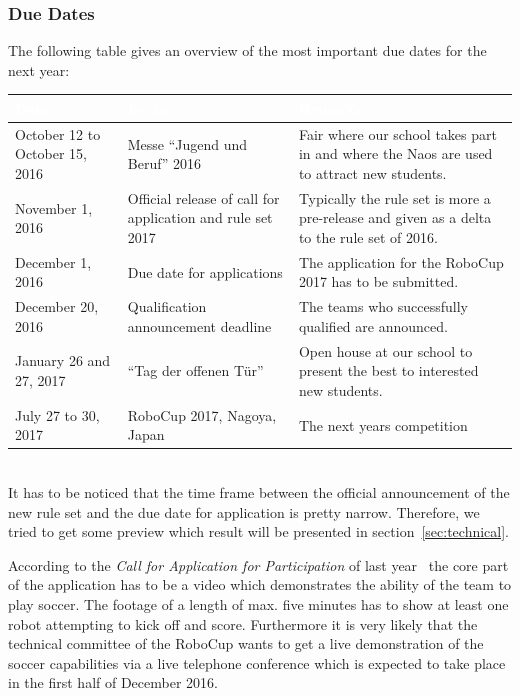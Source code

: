 \documentclass[12pt]{article}
\theoremstyle{definition}
\begin{document}
\subsubsection{Due Dates}
The following table gives an overview of the most important due dates for the next year:

\begin{tabular}{|p{.21\linewidth}|p{.3\linewidth}|p{.38\linewidth}|}
\cellcolor[gray]{0.5}\textcolor{white}{Date} & \cellcolor[gray]{0.43}\textcolor{white}{Event} & \cellcolor[gray]{0.5}\textcolor{white}{Remarks} \\ \hline
October 12 to October 15, 2016 & Messe ``Jugend und Beruf'' 2016 & Fair where our school takes part in and where the Naos are used to attract new students. \\ \hline
November 1, 2016 & Official release of call for application and rule set 2017 & Typically the rule set is more a pre-release and given as a delta to the rule set of 2016. \\ \hline
December 1, 2016 & Due date for applications & The application for the RoboCup 2017 has to be submitted.\\ \hline
December 20, 2016 & Qualification announcement deadline & The teams who successfully qualified are announced.\\ \hline
January 26 and 27, 2017 & ``Tag der offenen Tür'' & Open house at our school to present the best to interested new students.\\ \hline
July 27 to 30, 2017 & RoboCup 2017, Nagoya, Japan & The next years competition\\ \hline
\end{tabular}
\\

It has to be noticed that the time frame between the official announcement of the new rule set and the due date for application is pretty narrow. Therefore, we tried to get some preview which result will be presented in section~\ref{sec:technical}.

According to the {\em Call for Application for Participation} of last year~\cite{robocup_2016_standard_platform_league_call_2015} the core part of the application has to be a video which demonstrates the ability of the team to play soccer. The footage of a length of max. five minutes has to show at least one robot attempting to kick off and score. Furthermore it is very likely that the technical committee of the RoboCup wants to get a live demonstration of the soccer capabilities via a live telephone conference which is expected to take place in the first half of December 2016.
\end{document}
